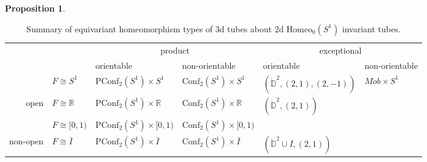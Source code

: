 \documentclass[10pt, oneside]{article}
\newcommand{\R}{\mathbb{R}}
\newcommand{\Z}{\mathbb{Z}}
\newcommand{\homeo}[1][S^1]{\text{Homeo}_0(#1)}
\newcommand{\cl}[1]{\overline{#1}}
\newcommand{\conf}[2][S^1]{\text{Conf}_{#2}(#1)}
\newcommand{\pconf}[2][S^1]{\text{PConf}_{#2}(#1)}
\theoremstyle{definition}
\newtheorem{prop}{Proposition}[section]
\theoremstyle{definition}
\begin{document}
\begin{prop}
\end{prop}
\setlength\extrarowheight{3pt}
\begin{table}[]
\begin{tabular}{rlll|ll}
\multicolumn{1}{l}{}       &                                              & \multicolumn{2}{c|}{product}                                                          & \multicolumn{2}{c}{exceptional}                                                                                 \\
\multicolumn{1}{l}{}       &                                              & \multicolumn{1}{l|}{orientable}                      & non-orientable                 & \multicolumn{1}{l|}{orientable}                                 & non-orientable                                \\ \cline{3-6}
                           & \multicolumn{1}{l|}{$F\cong S^1$}            & \multicolumn{1}{l|}{$\pconf{2}\times S^1$}           & $\conf{2}\times S^1$           & \multicolumn{1}{l|}{$(\mathring{\mathbb{D}}^2, (2, 1), (2,-1))$} & \multicolumn{1}{l|}{$M\ddot{o}b\times S^1$}   \\ \cline{2-6}
\multirow{-2}{*}{open}     & \multicolumn{1}{l|}{$F\cong \R$}             & \multicolumn{1}{l|}{$\pconf{2}\times \R$}            & $\conf{2}\times \R$            & \multicolumn{1}{l|}{$(\mathring{\mathbb{D}}^2, (2, 1))$}        & \multicolumn{1}{l|}{\cellcolor[HTML]{EFEFEF}} \\ \hline
                           & \multicolumn{1}{l|}{$F\cong \lbrack 0, 1 )$} & \multicolumn{1}{l|}{$\pconf{2}\times \lbrack 0, 1)$} & $\conf{2}\times \lbrack 0, 1)$ & \multicolumn{1}{l|}{\cellcolor[HTML]{EFEFEF}}                   & \multicolumn{1}{l|}{\cellcolor[HTML]{EFEFEF}} \\ \cline{2-6}
\multirow{-2}{*}{non-open} & \multicolumn{1}{l|}{$F\cong \cl{I}$}         & \multicolumn{1}{l|}{$\pconf{2}\times \cl{I}$}        & $\conf{2}\times \cl{I}$        & \multicolumn{1}{l|}{$(\mathring{\mathbb{D}}^2\cup I, (2,1))$}   & \multicolumn{1}{l|}{\cellcolor[HTML]{EFEFEF}} \\ \cline{2-6}
\end{tabular}
\caption{Summary of equivariant homeomorphism types of 3d tubes about 2d $\homeo$ invariant tubes.}
\label{table:orbit-bundles}
\end{table}
\end{document}
